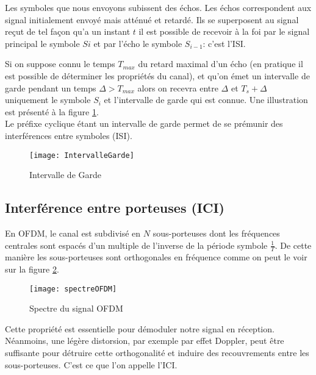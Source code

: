 Les symboles que nous envoyons subissent des échos. Les échos correspondent aux
signal initialement envoyé mais atténué et retardé. Ils se superposent au signal
reçut de tel façon qu'a un instant $t$ il est possible de recevoir à la foi par le
signal principal le symbole $Si$ et par l'écho le symbole $S_{i-1}$: c'est l'ISI.

Si on suppose connu le temps $T_{max}$ du retard maximal d'un écho (en pratique
il est possible de déterminer les propriétés du canal), et qu'on émet un
intervalle de garde pendant un temps $\Delta > T_{max}$ alors on recevra entre
$\Delta$ et $T_s+\Delta$ uniquement le symbole $S_i$ et l'intervalle de garde
qui est connue. Une illustration est présenté à la figure
\ref{fig:intervalleGarde}.
~\\

Le préfixe cyclique étant un intervalle de garde permet de se prémunir des
interférences entre symboles (ISI).



\begin{figure}[!h]
  \centering
  \texttt{[image: IntervalleGarde]}
  \caption{Intervalle de Garde}
  \label{fig:intervalleGarde}
\end{figure}

\subsection{Interférence entre porteuses (ICI)}


En OFDM, le canal est subdivisé en $N$ sous-porteuses dont les fréquences centrales
sont espacés d'un multiple de l'inverse de la période symbole $\frac{1}{T}$. De
cette manière les sous-porteuses sont orthogonales en fréquence comme on peut le
voir sur la figure \ref{fig:spectre}.

\begin{figure}[!h]
  \centering
  \texttt{[image: spectreOFDM]}
  \caption{Spectre du signal OFDM \cite{annick}}
  \label{fig:spectre}
\end{figure}

Cette propriété est essentielle pour démoduler notre signal en réception.
Néanmoins, une légère distorsion, par exemple par effet Doppler, peut être
suffisante pour détruire cette orthogonalité et induire des recouvrements entre
les sous-porteuses. C'est ce que l'on appelle l'ICI.

